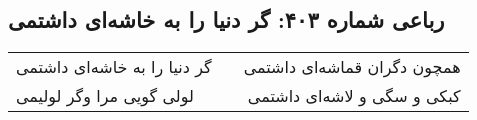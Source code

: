 \begin{center}
\section*{رباعی شماره ۴۰۳: گر دنیا را به خاشه‌ای داشتمی}
\label{sec:sh403}
\begin{longtable}{l p{0.5cm} r}
گر دنیا را به خاشه‌ای داشتمی
&&
همچون دگران قماشه‌ای داشتمی
\\
لولی گویی مرا وگر لولیمی
&&
کبکی و سگی و لاشه‌ای داشتمی
\\
\end{longtable}
\end{center}
